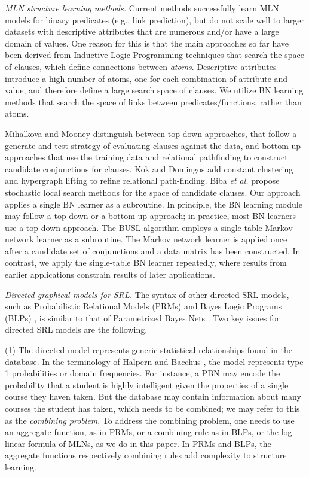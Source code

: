 \documentclass[letterpaper]{article}
\begin{document}
{\em MLN structure learning methods.} Current methods \cite{Kok2009,Mihalkova2007,Huynh2008,Biba2008} successfully learn MLN models for binary predicates (e.g., link prediction), but do not scale well to larger datasets with descriptive attributes that are numerous and/or have a large domain of values. One reason for this is that the main approaches so far have been derived from Inductive Logic Programming techniques that search the space of clauses, which define connections between {\em atoms}. Descriptive attributes introduce a high number of atoms, one for each combination of attribute and value, and therefore define a large search space of clauses. 
We utilize BN learning methods that search the space of links between predicates/functions, rather than atoms. 

Mihalkova and Mooney  distinguish between top-down approaches, that follow a generate-and-test strategy of evaluating clauses against the data, and bottom-up approaches that use the training data and relational pathfinding to construct candidate conjunctions for clauses. Kok and Domingos  add constant clustering and hypergraph lifting to refine relational path-finding. Biba {\em et al.}  propose stochastic local search methods for the space of candidate clauses. Our approach applies a single BN learner as a subroutine. In principle, the BN learning module may follow a top-down or a bottom-up approach; in practice, most BN learners use a top-down approach. 
The \textsc{BUSL} algorithm \cite{Mihalkova2007} employs a single-table Markov network learner as a subroutine. The Markov network learner is applied once after a candidate set of conjunctions and a data matrix has been constructed. In contrast, we apply the single-table BN learner repeatedly, where results from earlier applications constrain results of later applications. 


{\em Directed graphical models for SRL.} The syntax of other directed SRL models, such as Probabilistic Relational Models (PRMs) \cite{Getoor2007c} and Bayes Logic Programs (BLPs) \cite{Kersting2007}, is similar to that of Parametrized Bayes Nets \cite{Poole2003}. Two key issues for directed SRL models are the following. 

(1) The directed model represents generic statistical relationships found in the database. In the terminology of Halpern  and Bacchus , the model represents type 1 probabilities or domain frequencies. For instance, a PBN may encode the probability that a student is highly intelligent given the properties of a single course they haven taken. But the database may contain information about many courses the student has taken, which needs to be combined; we may refer to this as the {\em combining problem}. To address the combining problem, one needs to use an aggregate function, as in PRMs,  or a combining rule as in BLPs, or the log-linear formula of MLNs, as we do in this paper. In PRMs and BLPs, the aggregate functions respectively combining rules add complexity to structure learning.
\end{document}
